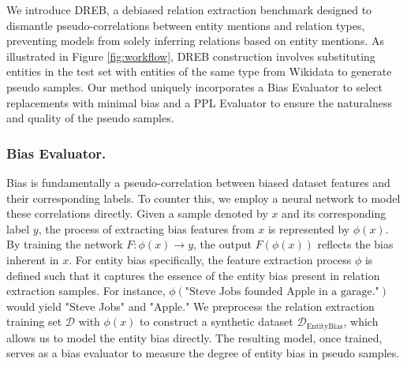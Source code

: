 \documentclass[letterpaper]{article} %
\begin{document}

We introduce DREB, a debiased relation extraction benchmark designed to dismantle pseudo-correlations between entity mentions and relation types, preventing models from solely inferring relations based on entity mentions. As illustrated in Figure \ref{fig:workflow}, DREB construction involves substituting entities in the test set with entities of the same type from Wikidata \cite{vrandevcic2014wikidata} to generate pseudo samples. Our method uniquely incorporates a Bias Evaluator to select replacements with minimal bias and a PPL Evaluator to ensure the naturalness and quality of the pseudo samples.

\subsubsection{Bias Evaluator.}
Bias is fundamentally a pseudo-correlation between biased dataset features and their corresponding labels. To counter this, we employ a neural network to model these correlations directly. Given a sample denoted by \( x \) and its corresponding label \( y \), the process of extracting bias features from \( x \) is represented by \( \phi(x) \). By training the network \( F : \phi(x) \rightarrow y \), the output \( F(\phi(x)) \) reflects the bias inherent in \( x \). For entity bias specifically, the feature extraction process \( \phi \) is defined such that it captures the essence of the entity bias present in relation extraction samples. For instance, \( \phi(\text{"Steve Jobs founded Apple in a garage."}) \) would yield "Steve Jobs" and "Apple." We preprocess the relation extraction training set \( \mathcal{D} \) with \( \phi(x) \) to construct a synthetic dataset \( \mathcal{D}_{\text{EntityBias}} \), which allows us to model the entity bias directly. The resulting model, once trained, serves as a bias evaluator to measure the degree of entity bias in pseudo samples.
\end{document}
